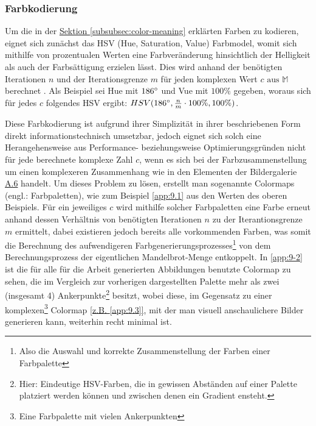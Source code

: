 \subsubsection{Farbkodierung}\label{subsubsec:color-coding}

Um die in der \hyperref[subsubsec:color-meaning]{Sektion \ref{subsubsec:color-meaning}}
erklärten Farben zu kodieren, eignet sich zunächst das HSV (Hue, Saturation, Value)
Farbmodel, womit sich mithilfe von prozentualen Werten eine
Farbveränderung hinsichtlich der Helligkeit als auch der Farbsättigung erzielen lässt.
Dies wird anhand der benötigten Iterationen $n$ und der Iterationsgrenze $m$
für jeden komplexen Wert $c \text{ aus } \mathbb{M}$
berechnet \cite{robert_p_color_2022}.
Als Beispiel sei Hue mit $186\degree$ und Vue mit $100\%$ gegeben, woraus
sich für jedes $c$ folgendes HSV ergibt:
$ HSV(186\degree, \frac{n}{m} \cdot 100\%, 100\%)$.

Diese Farbkodierung ist aufgrund ihrer Simplizität in ihrer beschriebenen
Form direkt informationstechnisch umsetzbar, jedoch eignet sich solch eine
Herangehensweise aus Performance- beziehungsweise Optimierungsgründen nicht
für jede berechnete komplexe Zahl $c$, wenn es sich bei der
Farbzusammenstellung um einen komplexeren Zusammenhang wie in den Elementen
der Bildergalerie \hyperref[app:6]{A.6} handelt.
Um dieses Problem zu lösen, erstellt man sogenannte Colormaps
(engl.: Farbpaletten), wie zum Beispiel \hyperref[app:9.1]{\ref{app:9.1}}
aus den Werten des oberen Beispiels.
Für ein jeweiliges $c$ wird mithilfe solcher Farbpaletten eine Farbe erneut anhand
dessen Verhältnis von benötigten Iterationen $n$ zu der Iterantionsgrenze $m$
ermittelt, dabei existieren jedoch bereits alle vorkommenden Farben, was somit
die Berechnung des aufwendigeren Farbgenerierungsprozesses\footnote{
  Also die Auswahl und korrekte Zusammenstellung der Farben einer Farbpalette
}
von dem Berechnungsprozess der eigentlichen Mandelbrot-Menge entkoppelt.
In \hyperref[app:9-2]{\ref{app:9-2}} ist die für alle für die Arbeit generierten
Abbildungen benutzte Colormap zu sehen, die im Vergleich zur vorherigen
dargestellten Palette mehr als zwei (insgesamt 4) Ankerpunkte\footnote{
  Hier: Eindeutige HSV-Farben, die in gewissen Abständen auf einer Palette
  platziert werden können und zwischen denen ein Gradient ensteht.
} besitzt, wobei diese, im Gegensatz zu einer komplexen\footnote{
  Eine Farbpalette mit vielen Ankerpunkten
} Colormap \hyperref[app:9.3]{[z.B. \ref{app:9.3}]},
mit der man visuell anschaulichere Bilder generieren kann,
weiterhin recht minimal ist.